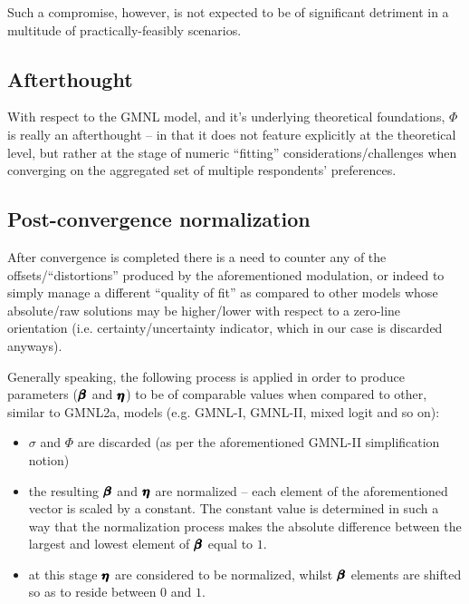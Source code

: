 \documentclass[12pt,a4paper]{article}
\begin{document}
Such a compromise, however, is not expected to be of significant detriment in a multitude of practically-feasibly scenarios.

\subsection{Afterthought}

With respect to the GMNL model, and it's underlying theoretical foundations, \(\Phi\) is really an afterthought -- in that it does not feature explicitly at the theoretical level, but rather at the stage of numeric ``fitting'' considerations/challenges when converging on the aggregated set of multiple respondents' preferences.

\subsection{Post-convergence normalization}

After convergence is completed there is a need to counter any of the offsets/``distortions'' produced by the aforementioned modulation, or indeed to simply manage a different ``quality of fit'' as compared to other models whose absolute/raw solutions may be higher/lower with respect to a zero-line orientation (i.e. certainty/uncertainty indicator, which in our case is discarded anyways). 

Generally speaking, the following process is applied in order to produce parameters (\(\pmb{\hm{\beta}}\) and \(\pmb{\hm{\eta}}\)) to be of comparable values when compared to other, similar to GMNL2a, models (e.g. GMNL-I, GMNL-II, mixed logit and so on):

\begin{itemize}

\item \(\sigma\) and \(\Phi\) are discarded (as per the aforementioned GMNL-II simplification notion)

\item the resulting \( \pmb{\hm{\beta}} \) and \( \pmb{\hm{\eta}} \) are normalized -- each element of the aforementioned vector is scaled by a constant. The constant value is determined in such a way that the normalization process makes the absolute difference between the largest and lowest element of \( \pmb{\hm{\beta}} \) equal to \(1\). 

\item at this stage \( \pmb{\hm{\eta}} \) are considered to be normalized, whilst \( \pmb{\hm{\beta}} \) elements are shifted so as to reside between \(0\) and \(1\).

\end{itemize}
\end{document}
